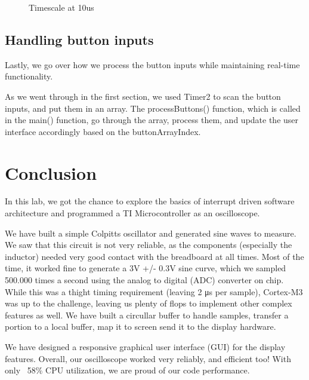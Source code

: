 \documentclass[12pt,oneside,letterpaper]{article}
\begin{document}
\begin{figure}[!h]
  \caption{Timescale at 10us}\label{fig:awesome_image3}
\endminipage
\end{figure}


\subsection{Handling button inputs}
Lastly, we go over how we process the button inputs while maintaining real-time functionality.

As we went through in the first section, we used Timer2 to scan the button inputs, and put them in an array. The processButtons() function, which is called in the main() function, go through the array, process them, and update the user interface accordingly based on the buttonArrayIndex.



\section{Conclusion}

In this lab, we got the chance to explore the basics of interrupt driven software architecture and programmed a TI Microcontroller as an oscilloscope. 

We have built a simple Colpitts oscillator and generated sine waves to measure. We saw that this circuit is not very reliable, as the components (especially the inductor) needed very good contact with the breadboard at all times. Most of the time, it worked fine to generate a 3V +/- 0.3V sine curve, which we sampled 500.000 times a second using the analog to digital (ADC) converter on chip. While this was a thight timing requirement (leaving 2 μs per sample), Cortex-M3 was up to the challenge, leaving us plenty of flops to implement other complex features as well. We have built a circullar buffer to handle samples, transfer a portion to a local buffer, map it to screen send it to the display hardware. 

We have designed a responsive graphical user interface (GUI) for the display features. Overall, our oscilloscope worked very reliably, and efficient too! With only ~58\% CPU utilization, we are proud of our code performance.
\end{document}
